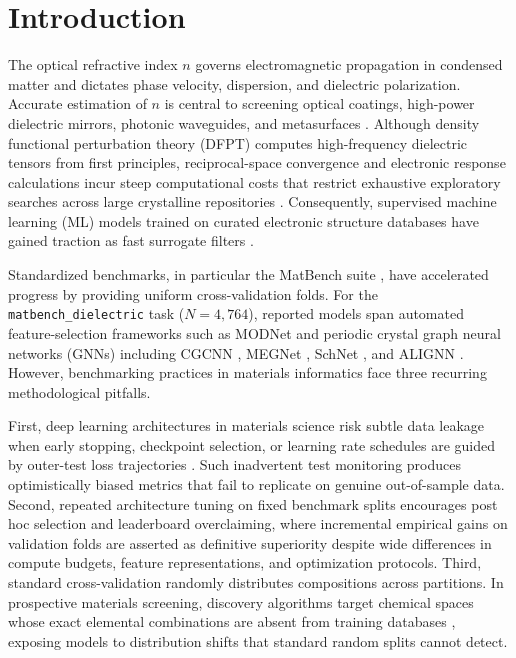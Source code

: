 \documentclass[final,3p,times]{elsarticle}
\begin{document}
\section{Introduction}
The optical refractive index $n$ governs electromagnetic propagation in condensed matter and dictates phase velocity, dispersion, and dielectric polarization. Accurate estimation of $n$ is central to screening optical coatings, high-power dielectric mirrors, photonic waveguides, and metasurfaces \cite{petousis2017high, ramprasad2017machine, dunn2020benchmarking}. Although density functional perturbation theory (DFPT) computes high-frequency dielectric tensors from first principles, reciprocal-space convergence and electronic response calculations incur steep computational costs that restrict exhaustive exploratory searches across large crystalline repositories \cite{petousis2017high}. Consequently, supervised machine learning (ML) models trained on curated electronic structure databases have gained traction as fast surrogate filters \cite{ward2016general, xie2018crystal, chen2019graph}.

Standardized benchmarks, in particular the MatBench suite \cite{dunn2020benchmarking}, have accelerated progress by providing uniform cross-validation folds. For the \texttt{matbench\_dielectric} task ($N = 4{,}764$), reported models span automated feature-selection frameworks such as MODNet \cite{de2021robust} and periodic crystal graph neural networks (GNNs) including CGCNN \cite{xie2018crystal}, MEGNet \cite{chen2019graph}, SchNet \cite{schutt2017schnet}, and ALIGNN \cite{choudhary2021atomistic}. However, benchmarking practices in materials informatics face three recurring methodological pitfalls.

First, deep learning architectures in materials science risk subtle data leakage when early stopping, checkpoint selection, or learning rate schedules are guided by outer-test loss trajectories \cite{artrith2021best}. Such inadvertent test monitoring produces optimistically biased metrics that fail to replicate on genuine out-of-sample data. Second, repeated architecture tuning on fixed benchmark splits encourages post hoc selection and leaderboard overclaiming, where incremental empirical gains on validation folds are asserted as definitive superiority despite wide differences in compute budgets, feature representations, and optimization protocols. Third, standard cross-validation randomly distributes compositions across partitions. In prospective materials screening, discovery algorithms target chemical spaces whose exact elemental combinations are absent from training databases \cite{xiong2023evaluating}, exposing models to distribution shifts that standard random splits cannot detect.
\end{document}
